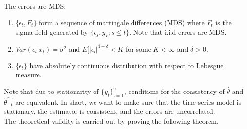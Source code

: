 \documentclass[12pt, oneside]{amsart}
\theoremstyle{definition}
\theoremstyle{remark}
\numberwithin{equation}{section}
\begin{document}
\begin{assumption}\label{assump3}
The errors are MDS: 
\begin{enumerate}
    \item $ \{ \epsilon_t,F_t \}$ form a sequence of martingale differences (MDS) where $F_t$ is the sigma field generated by $ \{ \epsilon_s, y_s;s \leq t \} $. Note that i.i.d errors are MDS.
    \item $Var(\epsilon_t | x_t) = \sigma^2$ and $E[|\epsilon_t|^{4+\delta} < K$ for some $K < \infty$ and $\delta > 0$.
    \item $\{\epsilon_t\}$ have absolutely continuous distribution with respect to Lebesgue measure. 
\end{enumerate}
\end{assumption}

Note that due to stationarity of $\{y_t\}^n_{t=1}$, conditions for the consistency of $\hat{\theta}$ and $\hat{\theta_{-t}}$ are equivalent. In short, we want to make sure that the time series model is stationary, the estimator is consistent, and the errors are uncorrelated.  \\

The theoretical validity is carried out by proving the following theorem. 
\end{document}
